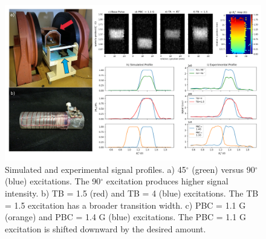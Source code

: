 \begin{figure}[h]
\centering
\includegraphics[width=1.1\textwidth]{figures/experimental_2D_processed_Rev2.png}
\caption{Simulated and experimental signal profiles. 
a) 45$^\circ$ (green) versus 90$^\circ$ (blue) excitations. The 90$^\circ$ excitation produces higher signal intensity.
b) TB = 1.5 (red) and TB = 4 (blue) excitations. The TB = 1.5 excitation has a broader transition width.
c) PBC = 1.1 G (orange) and PBC = 1.4 G (blue) excitations. The PBC = 1.1 G excitation is shifted downward by the desired amount.
}
\label{fig:exp}
\end{figure}

\renewcommand{\figurename}{Supporting Information Figure}
\renewcommand\thefigure{S\arabic{figure}}
\setcounter{figure}{0}



